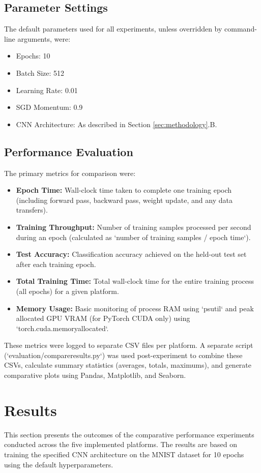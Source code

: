 \documentclass[conference]{IEEEtran} %
\begin{document}
\subsection{Parameter Settings}
The default parameters used for all experiments, unless overridden by command-line arguments, were:
\begin{itemize}
    \item Epochs: 10
    \item Batch Size: 512
    \item Learning Rate: 0.01
    \item SGD Momentum: 0.9
    \item CNN Architecture: As described in Section \ref{sec:methodology}.B.
\end{itemize}

\subsection{Performance Evaluation}
The primary metrics for comparison were:
\begin{itemize}
    \item \textbf{Epoch Time:} Wall-clock time taken to complete one training epoch (including forward pass, backward pass, weight update, and any data transfers).
    \item \textbf{Training Throughput:} Number of training samples processed per second during an epoch (calculated as `number of training samples / epoch time`).
    \item \textbf{Test Accuracy:} Classification accuracy achieved on the held-out test set after each training epoch.
    \item \textbf{Total Training Time:} Total wall-clock time for the entire training process (all epochs) for a given platform.
    \item \textbf{Memory Usage:} Basic monitoring of process RAM using `psutil` and peak allocated GPU VRAM (for PyTorch CUDA only) using `torch.cuda.memory\textunderscore allocated`.
\end{itemize}
These metrics were logged to separate CSV files per platform. A separate script (`evaluation/compare\textunderscore results.py`) was used post-experiment to combine these CSVs, calculate summary statistics (averages, totals, maximums), and generate comparative plots using Pandas, Matplotlib, and Seaborn.

\section{Results}
\label{sec:results}
This section presents the outcomes of the comparative performance experiments conducted across the five implemented platforms. The results are based on training the specified CNN architecture on the MNIST dataset for 10 epochs using the default hyperparameters.
\end{document}
